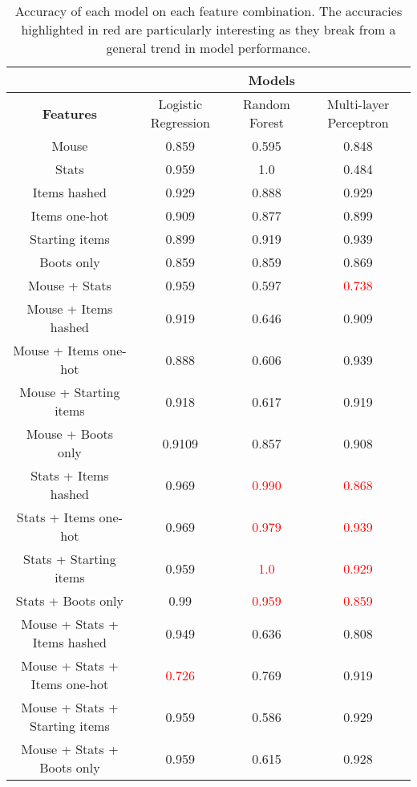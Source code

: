\documentclass[Report.tex]{subfiles}
\begin{document}
\begin{table}[H]
\begin{tabular}{ c | c | c | c }
& \multicolumn{3}{c}{\textbf{Models}} \\ \hline
\textbf{Features} & Logistic Regression & Random Forest & Multi-layer Perceptron \\ \hline
Mouse & 0.859 & 0.595 & 0.848 \\ \hline
Stats & 0.959 & 1.0 & 0.484 \\ \hline
Items hashed & 0.929 & 0.888 & 0.929 \\ \hline
Items one-hot & 0.909 & 0.877 & 0.899 \\ \hline
Starting items & 0.899 & 0.919 & 0.939 \\ \hline
Boots only & 0.859 & 0.859 & 0.869 \\ \hline
Mouse + Stats & 0.959 & 0.597 & \textcolor{red}{0.738} \\ \hline
Mouse + Items hashed & 0.919 & 0.646 & 0.909 \\ \hline
Mouse + Items one-hot & 0.888 & 0.606 & 0.939 \\ \hline
Mouse + Starting items & 0.918 & 0.617 & 0.919 \\ \hline
Mouse + Boots only & 0.9109 & 0.857 & 0.908 \\ \hline
Stats + Items hashed & 0.969 & \textcolor{red}{0.990} & \textcolor{red}{0.868} \\ \hline
Stats + Items one-hot & 0.969 & \textcolor{red}{0.979} & \textcolor{red}{0.939} \\ \hline
Stats + Starting items & 0.959 & \textcolor{red}{1.0} & \textcolor{red}{0.929} \\ \hline
Stats + Boots only & 0.99 & \textcolor{red}{0.959} & \textcolor{red}{0.859} \\ \hline
Mouse + Stats + Items hashed & 0.949 & 0.636 & 0.808 \\ \hline
Mouse + Stats + Items one-hot & \textcolor{red}{0.726} & 0.769 & 0.919 \\ \hline
Mouse + Stats + Starting items & 0.959 & 0.586 & 0.929 \\ \hline
Mouse + Stats + Boots only & 0.959 & 0.615 & 0.928 \\
\end{tabular}
\caption{Accuracy of each model on each feature combination. The accuracies highlighted in red are particularly interesting as they break from a general trend in model performance.}
\end{table}
\end{document}
